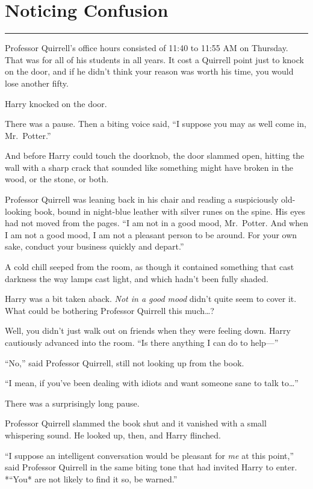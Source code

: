 \chapter{Noticing Confusion}

\begin{center}\rule{3in}{0.4pt}\end{center}

Professor Quirrell's office hours consisted of 11:40 to 11:55 AM on
Thursday. That was for all of his students in all years. It cost a
Quirrell point just to knock on the door, and if he didn't think your
reason was worth his time, you would lose another fifty.

Harry knocked on the door.

There was a pause. Then a biting voice said, ``I suppose you may as well
come in, Mr.~Potter.''

And before Harry could touch the doorknob, the door slammed open,
hitting the wall with a sharp crack that sounded like something might
have broken in the wood, or the stone, or both.

Professor Quirrell was leaning back in his chair and reading a
suspiciously old-looking book, bound in night-blue leather with silver
runes on the spine. His eyes had not moved from the pages. ``I am not in
a good mood, Mr.~Potter. And when I am not a good mood, I am not a
pleasant person to be around. For your own sake, conduct your business
quickly and depart.''

A cold chill seeped from the room, as though it contained something that
cast darkness the way lamps cast light, and which hadn't been fully
shaded.

Harry was a bit taken aback. \emph{Not in a good mood} didn't quite seem
to cover it. What could be bothering Professor Quirrell this
much\ldots{}?

Well, you didn't just walk out on friends when they were feeling down.
Harry cautiously advanced into the room. ``Is there anything I can do to
help---''

``No,'' said Professor Quirrell, still not looking up from the book.

``I mean, if you've been dealing with idiots and want someone sane to
talk to\ldots{}''

There was a surprisingly long pause.

Professor Quirrell slammed the book shut and it vanished with a small
whispering sound. He looked up, then, and Harry flinched.

``I suppose an intelligent conversation would be pleasant for \emph{me}
at this point,'' said Professor Quirrell in the same biting tone that
had invited Harry to enter. *``You* are not likely to find it so, be
warned.''

